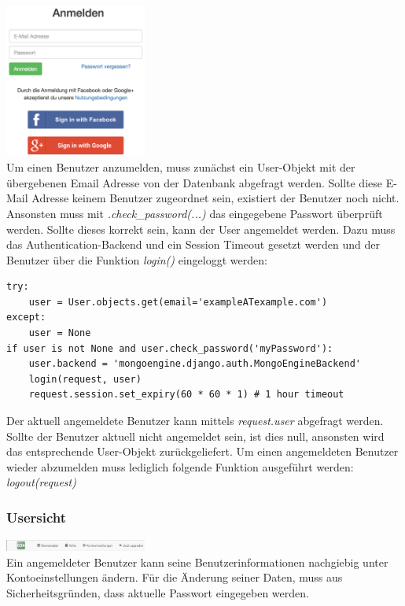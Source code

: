 \includegraphics[width=0.35\textwidth]{images/usermanagement/Anmelden}\\

Um einen Benutzer anzumelden, muss zunächst ein User-Objekt mit der übergebenen Email Adresse von der Datenbank abgefragt werden. Sollte diese E-Mail Adresse keinem Benutzer zugeordnet sein, existiert der Benutzer noch nicht. Ansonsten muss mit \textit{.check\_password(...)} das eingegebene Passwort überprüft werden. Sollte dieses korrekt sein, kann der User angemeldet werden. Dazu muss das Authentication-Backend und ein Session Timeout gesetzt werden und der Benutzer über die Funktion \textit{login()} eingeloggt werden:
\begin{lstlisting}
try:
    user = User.objects.get(email='exampleATexample.com')
except:
    user = None
if user is not None and user.check_password('myPassword'):
    user.backend = 'mongoengine.django.auth.MongoEngineBackend'
    login(request, user)
    request.session.set_expiry(60 * 60 * 1) # 1 hour timeout
\end{lstlisting}

Der aktuell angemeldete Benutzer kann mittels \textit{request.user} abgefragt werden. Sollte der Benutzer aktuell nicht angemeldet sein, ist dies null, ansonsten wird das entsprechende User-Objekt zurückgeliefert.
Um einen angemeldeten Benutzer wieder abzumelden muss lediglich folgende Funktion ausgeführt werden:
\textit{logout(request)}

\subsubsection{Usersicht}

\includegraphics[width=0.35\textwidth]{images/usermanagement/Usersicht}\\

Ein angemeldeter Benutzer kann seine Benutzerinformationen nachgiebig unter Kontoeinstellungen ändern. Für die Änderung seiner Daten, muss aus Sicherheitsgründen, dass aktuelle Passwort eingegeben werden.


